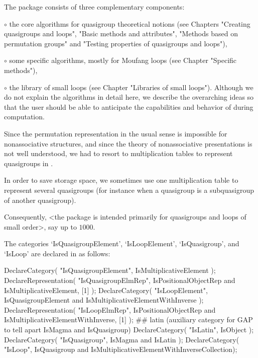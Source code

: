 
The package consists of three complementary components:
\beginlist%
\item{$\circ$} the core algorithms for quasigroup theoretical notions
    (see Chapters "Creating quasigroups and loops",
    "Basic methods and attributes",
    "Methods based on permutation groups" and
    "Testing properties of quasigroups and loops"),
\item{$\circ$} some specific algorithms, mostly for Moufang loops
    (see Chapter "Specific methods"),
\item{$\circ$} the library of small loops (see Chapter
    "Libraries of small loops").
\endlist
Although we do not explain the algorithms in detail here, we describe the
overarching ideas so that the user should be able to anticipate the
capabilities and behavior of {\LOOPS} during computation.


Since the permutation representation in the usual sense is impossible for
nonassociative structures, and since the theory of nonassociative presentations
is not well understood, we had to resort to multiplication tables to represent
quasigroups in {\GAP}.

In order to save storage space, we sometimes use one multiplication table to
represent several quasigroups (for instance when a quasigroup is a
subquasigroup of another quasigroup).

Consequently, <the package is intended primarily for quasigroups and loops of
small order>, say up to $1000$.

The {\GAP} categories `IsQuasigroupElement', `IsLoopElement', `IsQuasigroup',
and `IsLoop' are declared in {\LOOPS} as follows:

\begintt
DeclareCategory( "IsQuasigroupElement", IsMultiplicativeElement );
DeclareRepresentation( "IsQuasigroupElmRep",
    IsPositionalObjectRep and IsMultiplicativeElement, [1] );
DeclareCategory( "IsLoopElement",
    IsQuasigroupElement and IsMultiplicativeElementWithInverse );
DeclareRepresentation( "IsLoopElmRep",
    IsPositionalObjectRep and IsMultiplicativeElementWithInverse, [1] );
## latin (auxiliary category for GAP to tell apart IsMagma and IsQuasigroup)
DeclareCategory( "IsLatin", IsObject );
DeclareCategory( "IsQuasigroup", IsMagma and IsLatin );
DeclareCategory( "IsLoop", IsQuasigroup and
    IsMultiplicativeElementWithInverseCollection);
\endtt

